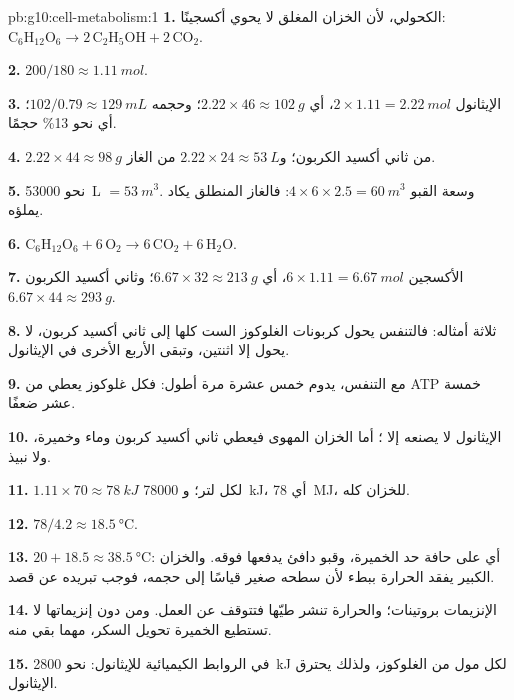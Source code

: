 \begin{solution}{pb:g10:cell-metabolism:1}
\textbf{1.}  الكحولي، لأن الخزان المغلق لا يحوي أكسجينًا:
$\mathrm{C_6H_{12}O_6} \to 2\,\mathrm{C_2H_5OH} +
2\,\mathrm{CO_2}$.

\textbf{2.} $200/180 \approx \qty{1.11}{mol}$.

\textbf{3.} الإيثانول $2 \times 1.11 = \qty{2.22}{mol}$، أي $2.22
\times 46 \approx \qty{102}{g}$؛ وحجمه $102/0.79 \approx
\qty{129}{mL}$؛ أي نحو 13\% حجمًا.

\textbf{4.} $2.22 \times 44 \approx \qty{98}{g}$ من ثاني أكسيد
الكربون؛ و$2.22 \times 24 \approx \qty{53}{L}$ من الغاز.

\textbf{5.} نحو \qty{53000}{L} $= \qty{53}{m^3}$. وسعة القبو
$4 \times 6 \times 2.5 = \qty{60}{m^3}$: فالغاز المنطلق يكاد يملؤه.

\textbf{6.} $\mathrm{C_6H_{12}O_6} + 6\,\mathrm{O_2} \to
6\,\mathrm{CO_2} + 6\,\mathrm{H_2O}$.

\textbf{7.} الأكسجين $6 \times 1.11 = \qty{6.67}{mol}$، أي $6.67 \times 32
\approx \qty{213}{g}$؛ وثاني أكسيد الكربون $6.67 \times 44 \approx
\qty{293}{g}$.

\textbf{8.} ثلاثة أمثاله: فالتنفس يحول كربونات الغلوكوز الست كلها إلى
ثاني أكسيد كربون،  لا يحول إلا اثنتين، وتبقى الأربع الأخرى في
الإيثانول.

\textbf{9.} مع التنفس، يدوم خمس عشرة مرة أطول: فكل غلوكوز يعطي من ATP
خمسة عشر ضعفًا.

\textbf{10.} الإيثانول لا يصنعه إلا ؛ أما الخزان المهوى فيعطي
ثاني أكسيد كربون وماء وخميرة، ولا نبيذ.

\textbf{11.} $1.11 \times 70 \approx \qty{78}{kJ}$ لكل لتر؛ و
\qty{78000}{kJ}، أي \qty{78}{MJ}، للخزان كله.

\textbf{12.} $78/4.2 \approx \qty{18.5}{\celsius}$.

\textbf{13.} $20 + 18.5 \approx \qty{38.5}{\celsius}$: أي على حافة حد
الخميرة، وقبو دافئ يدفعها فوقه. والخزان الكبير يفقد الحرارة ببطء لأن
سطحه صغير قياسًا إلى حجمه، فوجب تبريده عن قصد.

\textbf{14.} الإنزيمات بروتينات؛ والحرارة تنشر طيّها فتتوقف عن العمل.
ومن دون إنزيماتها لا تستطيع الخميرة تحويل السكر، مهما بقي منه.

\textbf{15.} في الروابط الكيميائية للإيثانول: نحو \qty{2800}{kJ} لكل
مول من الغلوكوز، ولذلك يحترق الإيثانول.


\end{solution}
